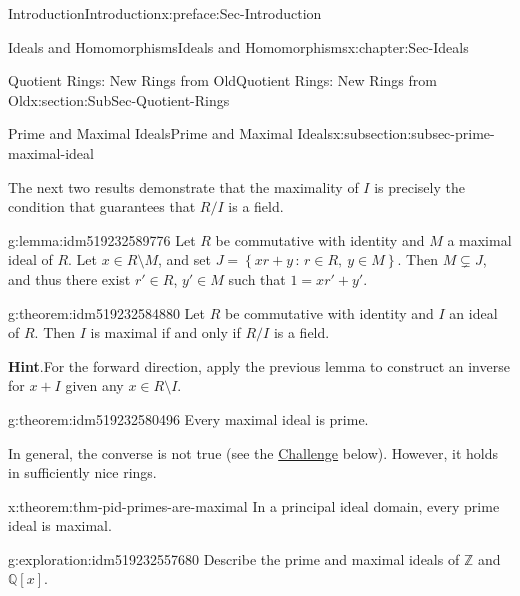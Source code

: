 \documentclass[oneside,10pt,]{book}
\newcommand{\blocktitlefont}{\relax}
\numberwithin{equation}{section}
\newcommand{\setof}[2]{{\left\{#1\,\colon\,#2\right\}}}
\def\Z{{\mathbb Z}}
\def\Q{{\mathbb Q}}
\begin{document}
\begin{preface}{Introduction}{}{Introduction}{}{}{x:preface:Sec-Introduction}
\begin{chapterptx}{Ideals and Homomorphisms}{}{Ideals and Homomorphisms}{}{}{x:chapter:Sec-Ideals}
\begin{sectionptx}{Quotient Rings: New Rings from Old}{}{Quotient Rings: New Rings from Old}{}{}{x:section:SubSec-Quotient-Rings}
\begin{subsectionptx}{Prime and Maximal Ideals}{}{Prime and Maximal Ideals}{}{}{x:subsection:subsec-prime-maximal-ideal}
\par
The next two results demonstrate that the maximality of \(I\) is precisely the condition that guarantees that \(R/I\) is a field.%
\begin{lemma}{}{}{g:lemma:idm519232589776}%
Let \(R\) be commutative with identity and \(M\) a maximal ideal of \(R\). Let \(x\in R\setminus M\), and set \(J = \setof{xr+y}{r\in R, \ y\in M}\). Then \(M\subsetneq J\), and thus there exist \(r'\in R\), \(y'\in M\) such that \(1 = xr'+y'\).%
\end{lemma}
\begin{theorem}{}{}{g:theorem:idm519232584880}%
Let \(R\) be commutative with identity and \(I\) an ideal of \(R\). Then \(I\) is maximal if and only if \(R/I\) is a field.%


\textbf{\blocktitlefont Hint}.\quad{}For the forward direction, apply the previous lemma to construct an inverse for \(x+I\) given any \(x\in R\setminus I\).%
\end{theorem}
\begin{theorem}{}{}{g:theorem:idm519232580496}%
Every maximal ideal is prime.%
\end{theorem}
In general, the converse is not true (see the \hyperref[x:assemblage:challenge-nonmaximal-prime]{Challenge} below). However, it holds in sufficiently nice rings.%
\begin{theorem}{}{}{x:theorem:thm-pid-primes-are-maximal}%
In a principal ideal domain, every prime ideal is maximal.%
\end{theorem}
\begin{exploration}{}{g:exploration:idm519232557680}%
Describe the prime and maximal ideals of \(\Z\) and \(\Q[x]\).%
\par\smallskip%
\noindent


\end{exploration}
\end{subsectionptx}
\end{sectionptx}
\end{chapterptx}
\end{preface}
\end{document}
